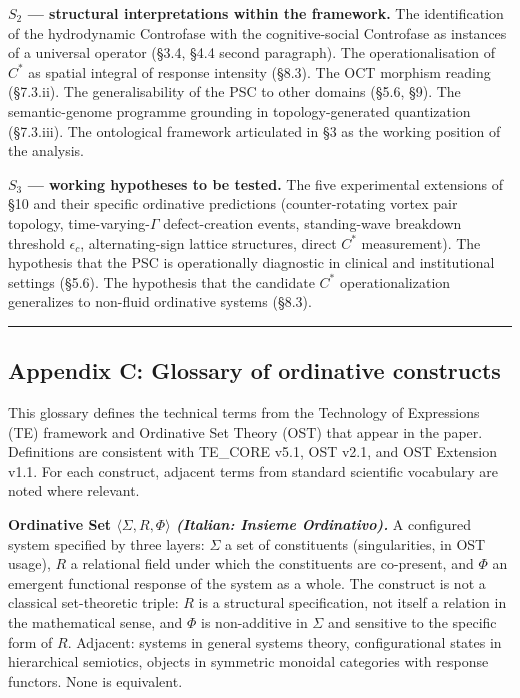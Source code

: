 \documentclass[
  11pt,
  a4paper,
]{article}
\begin{document}
\textbf{\(S_2\) --- structural interpretations within the framework.}
The identification of the hydrodynamic Controfase with the
cognitive-social Controfase as instances of a universal operator (§3.4,
§4.4 second paragraph). The operationalisation of \(C^*\) as spatial
integral of response intensity (§8.3). The OCT morphism reading
(§7.3.ii). The generalisability of the PSC to other domains (§5.6, §9).
The semantic-genome programme grounding in topology-generated
quantization (§7.3.iii). The ontological framework articulated in §3 as
the working position of the analysis.

\textbf{\(S_3\) --- working hypotheses to be tested.} The five
experimental extensions of §10 and their specific ordinative predictions
(counter-rotating vortex pair topology, time-varying-\(\Gamma\)
defect-creation events, standing-wave breakdown threshold
\(\epsilon_c\), alternating-sign lattice structures, direct \(C^*\)
measurement). The hypothesis that the PSC is operationally diagnostic in
clinical and institutional settings (§5.6). The hypothesis that the
candidate \(C^*\) operationalization generalizes to non-fluid ordinative
systems (§8.3).

\begin{center}\rule{0.5\linewidth}{0.5pt}\end{center}

\subsection{Appendix C: Glossary of ordinative
constructs}\label{appendix-c-glossary-of-ordinative-constructs}

This glossary defines the technical terms from the Technology of
Expressions (TE) framework and Ordinative Set Theory (OST) that appear
in the paper. Definitions are consistent with TE\_CORE v5.1, OST v2.1,
and OST Extension v1.1. For each construct, adjacent terms from standard
scientific vocabulary are noted where relevant.

\textbf{Ordinative Set \(\langle \Sigma, R, \Phi \rangle\)
\emph{(Italian: Insieme Ordinativo).}} A configured system specified by
three layers: \(\Sigma\) a set of constituents (singularities, in OST
usage), \(R\) a relational field under which the constituents are
co-present, and \(\Phi\) an emergent functional response of the system
as a whole. The construct is not a classical set-theoretic triple: \(R\)
is a structural specification, not itself a relation in the mathematical
sense, and \(\Phi\) is non-additive in \(\Sigma\) and sensitive to the
specific form of \(R\). Adjacent: systems in general systems theory,
configurational states in hierarchical semiotics, objects in symmetric
monoidal categories with response functors. None is equivalent.
\end{document}
